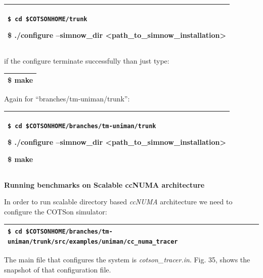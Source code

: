 \documentclass[a4paper]{article}
\begin{document}
\begin{flushleft}
\tablehead{}
\begin{supertabular}{|m{6.29346in}|}
\hline
{ \texttt{\$ cd }\texttt{\$COTSONHOME/trunk}}

\ttfamily \$ ./configure --simnow\_dir
{\textless}path\_to\_simnow\_installation{\textgreater}\\\hline
\end{supertabular}
\end{flushleft}
{
if the configure terminate successfully than just type:}

\begin{flushleft}
\tablehead{}
\begin{supertabular}{|m{6.29346in}|}
\hline
{}\ttfamily \$ make\\\hline
\end{supertabular}
\end{flushleft}
{
Again for
{\textquotedblleft}branches/tm-uniman/trunk{\textquotedblright}:}

\begin{flushleft}
\tablehead{}
\begin{supertabular}{|m{6.29346in}|}
\hline
{ \texttt{\$ cd
}\texttt{\$COTSONHOME/branches/tm-uniman/trunk}}

{\ttfamily \$ ./configure --simnow\_dir
{\textless}path\_to\_simnow\_installation{\textgreater}}

\ttfamily \$ make\\\hline
\end{supertabular}
\end{flushleft}
{
\textbf{Running benchmarks on Scalable ccNUMA architecture}}

{
In order to run scalable directory based \textit{ccNUMA} architecture we
need to configure the COTSon simulator:}

\begin{flushleft}
\tablehead{}
\begin{supertabular}{|m{6.29346in}|}
\hline
{} \texttt{\$ cd
\$COTSONHOME/branches/tm-uniman/trunk/src/examples/uniman/cc\_numa\_tracer}\\\hline
\end{supertabular}
\end{flushleft}
{
The main file that configures the system is \textit{cotson\_tracer.in}.
Fig. 35, shows the snapshot of that configuration file.}
\end{document}
